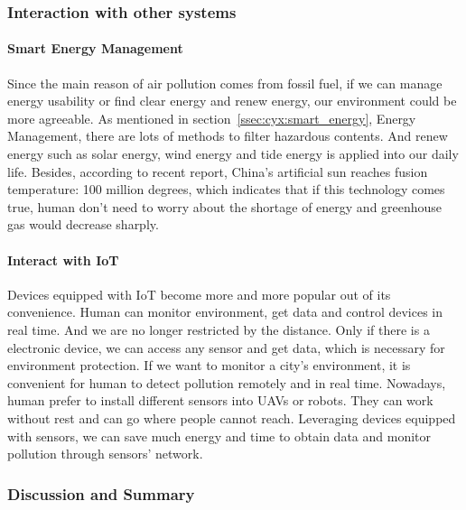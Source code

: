 \documentclass[letterpaper, twocolumn, 10pt, conference]{IEEEtran}
\begin{document}
\subsubsection{Interaction with other systems}
\label{sssec:zzj:smart_environment:interaction}

\paragraph{Smart Energy Management}

Since the main reason of air pollution comes from fossil fuel, if we can manage energy usability or find clear energy and renew energy, our environment could be more agreeable. As mentioned in section~\ref{ssec:cyx:smart_energy}, Energy Management, there are lots of methods to filter hazardous contents. And renew energy such as solar energy, wind energy and tide energy is applied into our daily life. Besides, according to recent report, China's artificial sun reaches fusion temperature: 100 million degrees, which indicates that if this technology comes true, human don't need to worry about the shortage of energy and greenhouse gas would decrease sharply. 

\paragraph{Interact with IoT}
 
Devices equipped with IoT become more and more popular out of its convenience. Human can monitor environment, get data and control devices in real time. And we are no longer restricted by the distance. Only if there is a electronic device, we can access any sensor and get data, which is necessary for environment protection. If we want to monitor a city's environment, it is convenient for human to detect pollution remotely and in real time. Nowadays, human prefer to install different sensors into UAVs or robots. They can work without rest and can go where people cannot reach. Leveraging devices equipped with sensors, we can save much energy and time to obtain data and monitor pollution through sensors' network.

\subsubsection{Discussion and Summary}
\label{sssec:zzj:smart_environment:discussion}
\end{document}
